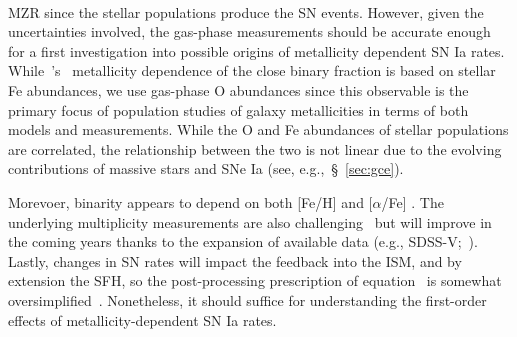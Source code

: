 \documentclass[foo.tex]{subfiles}
\begin{document}
$${MZR since the stellar populations produce the SN events.
However, given the uncertainties involved, the gas-phase measurements should be
accurate enough for a first investigation into possible origins of metallicity
dependent SN Ia rates.
While~\citeauthor{Moe2019}'s~\citeyearpar{Moe2019} metallicity dependence of
the close binary fraction is based on stellar Fe abundances, we use gas-phase
O abundances since this observable is the primary focus of population studies
of galaxy metallicities in terms of both models and measurements.
While the O and Fe abundances of stellar populations are correlated, the
relationship between the two is not linear due to the evolving contributions of
massive stars and SNe Ia (see, e.g.,~\S~\ref{sec:gce}).
\par
Morevoer, binarity appears to depend on both [Fe/H] and [$\alpha$/Fe]
\citep{Mazzola2020}.
The underlying multiplicity measurements are also challenging~\citep{Moe2017,
Offner2022} but will improve in the coming years thanks to the expansion of
available data (e.g., SDSS-V;~\citealp{Kollmeier2017}).
Lastly, changes in SN rates will impact the feedback into the ISM, and by
extension the SFH, so the post-processing prescription of
equation~ is somewhat oversimplified~\citep{Gandhi2022}.
Nonetheless, it should suffice for understanding the first-order effects of
metallicity-dependent SN Ia rates.
}
\end{document}
